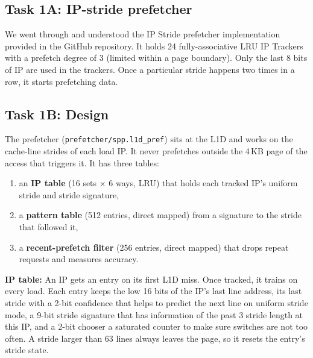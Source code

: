 
\subsection{Task 1A: IP-stride prefetcher}
We went through and understood the IP Stride prefetcher implementation provided in the GitHub repository.
It holds 24 fully-associative LRU IP Trackers with a prefetch degree of 3 (limited within a page boundary). Only the last 8 bits of IP are used in the trackers. Once a particular stride happens two times in a row, it starts prefetching data.

\subsection{Task 1B: Design}

The prefetcher (\texttt{prefetcher/spp.l1d\_pref}) sits at the L1D and works on the cache-line strides of each load IP. It never prefetches outside the 4\,KB page of the access that triggers it. It has three tables:
\begin{enumerate}
  \item an \textbf{IP table} (16 sets $\times$ 6 ways, LRU) that holds each tracked IP's uniform stride and stride signature,
  \item a \textbf{pattern table} (512 entries, direct mapped) from a signature to the stride that followed it,
  \item a \textbf{recent-prefetch filter} (256 entries, direct mapped) that drops repeat requests and measures accuracy.
\end{enumerate}

\textbf{IP table:} An IP gets an entry on its first L1D miss. Once tracked, it trains on every load. Each entry keeps the low 16 bits of the IP's last line address, its last stride with a 2-bit confidence that helps to predict the next line on uniform stride mode, a 9-bit stride signature that has information of the past 3 stride length at this IP, and a 2-bit chooser a saturated counter to make sure switches are not too often. A stride larger than 63 lines always leaves the page, so it resets the entry's stride state.


